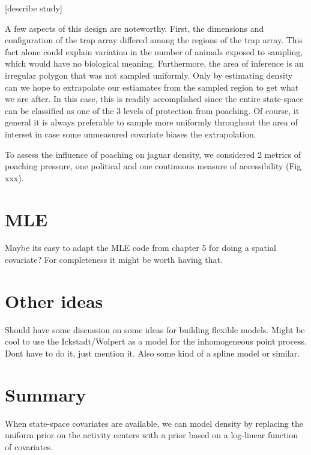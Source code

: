 [describe study]

A few aspects of this design are noteworthy. First, the dimensions and
configuration of the trap array differed among the regions of the trap
array. This fact alone could explain variation in the number of
animals exposed to sampling, which would have no biological
meaning. Furthermore, the area of inference is an irregular polygon
that was not sampled uniformly. Only by estimating density can we hope
to extrapolate our estiamates from the sampled region to get what we
are after. In this case, this is readily accomplished since the entire
state-space can be classified as one of the 3 levels of protection
from poaching. Of course, it general it is always preferable to sample
more uniformly throughout the area of interset in case some unmeasured
covariate biases the extrapolation.

To assess the influence of poaching on jaguar density, we considered 2
metrics of poaching pressure, one political and one continuous measure
of accessibility (Fig xxx). 



\section{MLE}

Maybe its easy to adapt the MLE code from chapter 5 for doing a
spatial covariate? For completeness it might be worth having that.

\section{Other ideas}

Should have some discussion on some ideas for building flexible
models. Might be cool to use the Ickstadt/Wolpert as a model for the
inhomogeneous point process. Dont have to do it, just mention it. Also
some kind of a spline model or similar.




\section{Summary}

When state-space covariates are available, we can model
density by replacing the uniform prior on the activity centers with a
prior based on a log-linear function of covariates.




